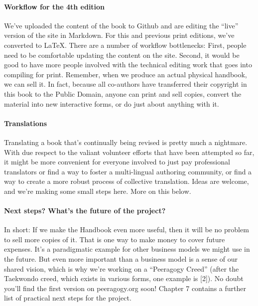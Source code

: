 \hypertarget{workflow-for-the-4th-edition}{%
\paragraph{Workflow for the 4th edition}\label{workflow-for-the-4th-edition}}

We've uploaded the content of the book to Github and are editing the
``live'' version of the site in Markdown. For this and previous print
editions, we've converted to LaTeX. There are a number of workflow
bottlenecks: First, people need to be comfortable updating the content
on the site. Second, it would be good to have more people involved with
the technical editing work that goes into compiling for print. Remember,
when we produce an actual physical handbook, we can sell it. In fact,
because all co-authors have transferred their copyright in this book to
the Public Domain, anyone can print and sell copies, convert the
material into new interactive forms, or do just about anything with it.

\hypertarget{translations}{%
\paragraph{Translations}\label{translations}}

Translating a book that's continually being revised is pretty much a
nightmare. With due respect to the valiant volunteer efforts that have
been attempted so far, it might be more convenient for everyone involved
to just pay professional translators or find a way to foster a
multi-lingual authoring community, or find a way to create a more robust
process of collective translation. Ideas are welcome, and we're making
some small steps here. More on this below.

\hypertarget{next-steps-whats-the-future-of-the-project}{%
\paragraph{Next steps? What's the future of the
project?}\label{next-steps-whats-the-future-of-the-project}}

In short: If we make the Handbook even more useful, then it will be no
problem to sell more copies of it. That is one way to make money to
cover future expenses. It's a paradigmatic example for other business
models we might use in the future. But even more important than a
business model is a sense of our shared vision, which is why we're
working on a ``Peeragogy Creed'' (after the Taekwondo creed, which
exists in various forms, one example is {[}2{]}). No doubt you'll find
the first version on peeragogy.org soon! Chapter 7 contains a further
list of practical next steps for the project.

